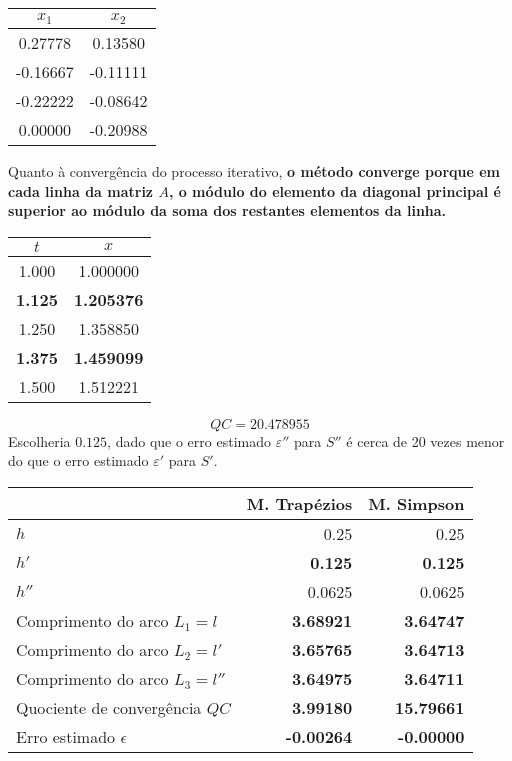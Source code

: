 \setcounter{chapter}{12}


\begin{center} \begin{tabular}{c | c}
	$x_1$ & $x_2$ \\ \hline
	0.27778  &      0.13580 \\
	-0.16667 &      -0.11111 \\
	-0.22222 &      -0.08642 \\
	0.00000  &      -0.20988
\end{tabular} \end{center}
Quanto à convergência do processo iterativo, \textbf{o método converge porque em cada linha da matriz $A$, o módulo do elemento da diagonal principal é superior ao módulo da soma dos restantes elementos da linha.}


\begin{center} \begin{tabular}{c | c}
	$t$ & $x$ \\ \hline
	1.000 & 1.000000 \\
	\textbf{1.125} & \textbf{1.205376} \\
	1.250 & 1.358850 \\
	\textbf{1.375} & \textbf{1.459099} \\
	1.500 & 1.512221
\end{tabular} \end{center}
\begin{equation*}
	QC=20.478955
\end{equation*}
Escolheria $0.125$, dado que o erro estimado $\varepsilon''$ para $S''$ é cerca de 20 vezes menor do que o erro estimado $\varepsilon'$ para $S'$.


\begin{center} \begin{tabular}{l | r r}
	& M. Trapézios & M. Simpson \\ \hline
	$h$ & 0.25 & 0.25 \\
	$h'$ & \textbf{0.125} & \textbf{0.125} \\
	$h''$ & 0.0625 & 0.0625 \\
	Comprimento do arco $L_1=l  $  & \textbf{3.68921} & \textbf{3.64747} \\
	Comprimento do arco $L_2=l' $  & \textbf{3.65765} & \textbf{3.64713} \\
	Comprimento do arco $L_3=l''$  & \textbf{3.64975} & \textbf{3.64711} \\
	Quociente de convergência $QC$ & \textbf{3.99180} & \textbf{15.79661} \\
	Erro estimado $\epsilon$       & \textbf{-0.00264} & \textbf{-0.00000}
\end{tabular} \end{center}


